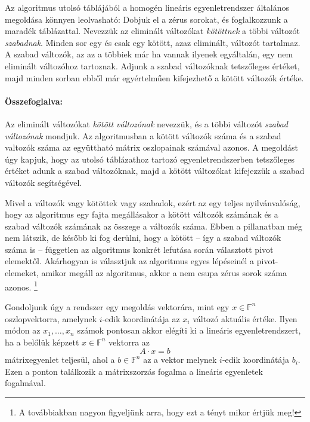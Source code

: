 \documentclass[a4paper, showtrims]{memoir}
\theoremstyle{plain}
\theoremstyle{remark}
\theoremstyle{definition}
\begin{document}
Az algoritmus utolsó táblájából a homogén lineáris egyenletrendszer általános megoldása könnyen leolvasható:
Dobjuk el a zérus sorokat, és foglalkozzunk a maradék táblázattal.
Nevezzük az eliminált változókat \emph{kötöttnek}
a többi változót \emph{szabadnak}.
Minden sor egy és csak egy kötött, azaz eliminált, változót tartalmaz.
A szabad változók, az az a többiek már ha vannak ilyenek egyáltalán, egy nem eliminált változóhoz tartoznak.
Adjunk a szabad változóknak tetszőleges értéket,
majd minden sorban ebből már egyértelműen kifejezhető a kötött változók értéke.

\paragraph{Összefoglalva:}\hspace{-1.em}
Az eliminált változókat
\emph{kötött változónak}
nevezzük,
és a többi változót
\emph{szabad változónak}
mondjuk. 
Az algoritmusban a kötött változók száma és a szabad valtozók száma az együttható mátrix oszlopainak számával azonos.
A megoldást úgy kapjuk, 
hogy az utolsó táblázathoz tartozó egyenletrendszerben tetszőleges értéket adunk a szabad változóknak,
majd a kötött változókat kifejezzük a szabad változók segítségével.

Mivel a változók vagy kötöttek vagy szabadok,
ezért az egy teljes nyilvánvalóság, 
hogy az algoritmus egy fajta megállásakor a kötött változók számának és a szabad változók számának az összege a változók száma.
Ebben a pillanatban még nem látszik,
de később ki fog derülni,
hogy a kötött -- így a szabad változók száma is -- független az algoritmus konkrét lefutása során választott pivot elemektől.
Akárhogyan is választjuk az algoritmus egyes lépéseinél a pivot-elemeket,
amikor megáll az algoritmus, akkor a nem csupa zérus sorok száma azonos.
\footnote{A továbbiakban nagyon figyeljünk arra, hogy ezt a tényt mikor értjük meg!}

Gondoljunk úgy a rendszer egy megoldás vektorára, 
mint egy $x\in\mathbb{F}^n$ oszlopvektorra,
amelynek $i$-edik koordinátája az $x_i$ változó aktuális értéke.
Ilyen módon az $x_1,\ldots,x_n$ számok pontosan akkor elégíti ki a lineáris egyenletrendszert,
ha a belőlük képzett $x\in\mathbb{F}^n$ vektorra az
\[
	A\cdot x=b
\]
mátrixegyenlet teljesül, 
ahol a $b\in\mathbb{F}^n$ az a vektor melynek $i$-edik koordinátája $b_i$.
Ezen a ponton találkozik a mátrixszorzás fogalma a lineáris egyenletek fogalmával.
\end{document}
